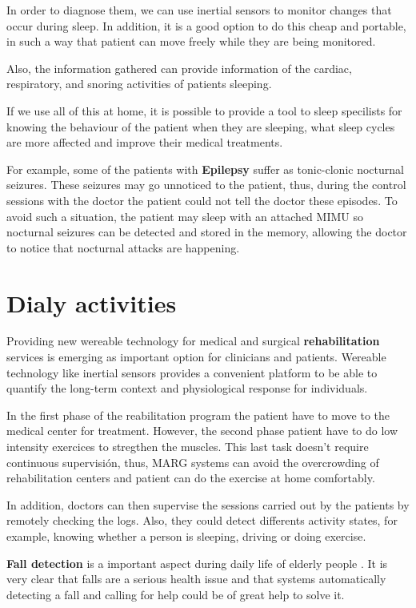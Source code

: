 In order to diagnose them, we can use inertial sensors to monitor changes that occur during sleep. In addition, it is a good option to do this  cheap and portable, in such a way that patient can move freely while they are being monitored\cite{A.Olivares2013}.

Also, the information gathered can provide information  of the cardiac, respiratory, and snoring activities of patients sleeping\cite{SanchezDaniel}.

If we use all of this at home, it is possible to provide a tool to sleep specilists for knowing the behaviour of the patient when they are sleeping, what sleep cycles are more affected and improve their medical  treatments. 

For example,  some of the patients with \textbf{Epilepsy} suffer as tonic-clonic nocturnal seizures. These seizures  may go unnoticed to the patient, thus, during the control sessions with the doctor the patient could not tell the doctor these episodes. To avoid such a situation, the patient may sleep with an attached MIMU so nocturnal seizures can be detected and stored in the memory, allowing the doctor to notice that nocturnal attacks are happening\cite{A.Olivares2013}. 

\section{Dialy activities }
Providing new wereable technology for medical and surgical \textbf{rehabilitation} services is emerging as important option for clinicians and patients. Wereable technology like inertial sensors provides  a convenient platform to be able to quantify the long-term context and physiological response for  individuals\cite{Sung}.

In the first phase of the reabilitation program the patient have to move to the medical center for treatment. However, the second phase patient have to do low intensity exercices to stregthen  the muscles. This last task doesn’t require continuous  supervisión, thus, MARG systems can avoid the overcrowding of rehabilitation centers and patient can do the exercise at home comfortably\cite{A.Olivares2013}.

In addition, doctors can then supervise the sessions carried out by the patients by remotely checking the logs. Also, they could detect differents activity states, for example, knowing whether a person  is sleeping, driving or doing exercise\cite{A.Olivares2013}.

\textbf{Fall detection} is a important aspect during daily life of elderly people . It is very clear that falls are a serious health issue and that systems automatically detecting a fall and calling for help could be of great help to solve it. 

